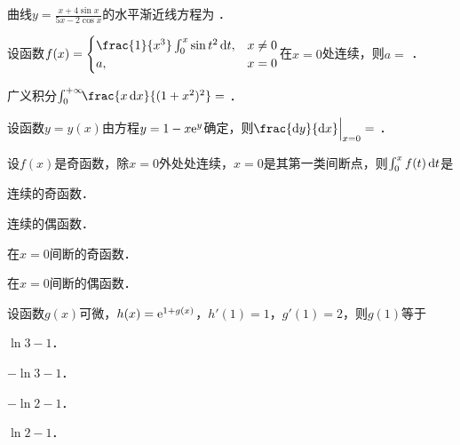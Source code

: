 \documentclass[plain,noanswer,medmath]{../../template/jnuexam}
\begin{document}






\begin{problem}
曲线$y = \frac{x + 4\sin x}{5x - 2\cos x}$的水平渐近线方程为 \fillin{}．
\end{problem}


\begin{problem}
设函数$f(x) = \begin{cases}
  \frac{1}{x^3}\int_0^x \sin t^2 \dt, & x \ne 0 \\
                                   a, & x = 0
\end{cases}$在$x = 0$处连续，则$a =$ \fillin{}．
\end{problem}


\begin{problem}
广义积分$\int_0^{+\infty}\!\!\frac{x\dx}{(1 + x^2)^2} =$ \fillin{}．
\end{problem}




\begin{problem}
设函数$y = y(x)$由方程$y = 1 - x\mathrm{e}^y$确定，则$\frac{\dy}{\dx}\Big|_{x=0}=$ \fillin{}．
\end{problem}








\begin{problem}
设$f(x)$是奇函数，除$x = 0$外处处连续，$x = 0$是其第一类间断点，则$\int_0^x f(t)\mathop{}\!\mathrm{d} t$是\pickout{}
\begin{abcd}
\item 连续的奇函数．
\item 连续的偶函数．
\item 在$x = 0$间断的奇函数．
\item 在$x = 0$间断的偶函数．
\end{abcd}
\end{problem}


\begin{problem}
设函数$g(x)$可微，$h(x) = \mathrm{e}^{1 + g(x)}$，$h'(1) = 1$，$g'(1) = 2$，则$g(1)$等于\pickout{}
\begin{abcd}
\item $\ln 3 - 1$．
\item $- \ln 3 - 1$．
\item $- \ln 2 - 1$．
\item $\ln 2 - 1$．
\end{abcd}
\end{problem}
\end{document}
